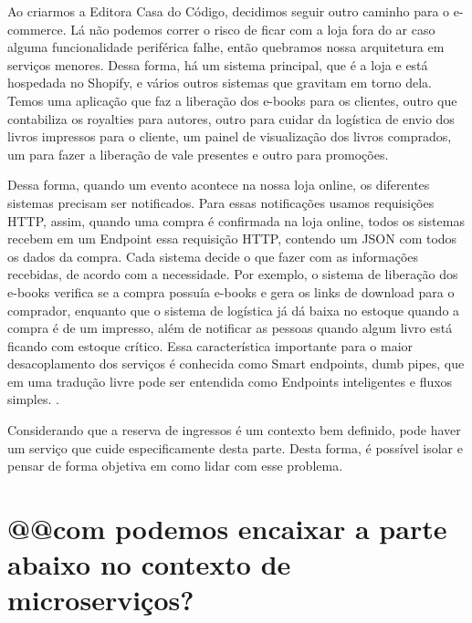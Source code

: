\begin{citacao}

Ao criarmos a Editora Casa do Código, decidimos seguir outro caminho para o e-commerce.
Lá não podemos correr o risco de ficar com a loja fora do ar caso alguma funcionalidade
periférica falhe, então quebramos nossa arquitetura em serviços menores. Dessa forma, há
um sistema principal, que é a loja e está hospedada no Shopify, e vários outros sistemas
que gravitam em torno dela. Temos uma aplicação que faz a liberação dos e-books para os
clientes, outro que contabiliza os royalties para autores, outro para cuidar da logística
de envio dos livros impressos para o cliente, um painel de visualização dos livros comprados,
um para fazer a liberação de vale presentes e outro para promoções.

Dessa forma, quando um evento acontece na nossa loja online, os diferentes sistemas precisam
ser notificados. Para essas notificações usamos requisições HTTP, assim, quando uma compra
é confirmada na loja online, todos os sistemas recebem em um Endpoint essa requisição HTTP,
contendo um JSON com todos os dados da compra. Cada sistema decide o que fazer com as informações
recebidas, de acordo com a necessidade. Por exemplo, o sistema de liberação dos e-books verifica
se a compra possuía e-books e gera os links de download para o comprador, enquanto que o sistema
de logística já dá baixa no estoque quando a compra é de um impresso, além de notificar as pessoas
quando algum livro está ficando com estoque crítico. Essa característica importante para o maior
desacoplamento dos serviços é conhecida como Smart endpoints, dumb pipes, que em uma tradução
livre pode ser entendida como Endpoints inteligentes e fluxos
simples. \cite{arquitetura-de-microservicos-ou-monolitica}.

\end{citacao}


Considerando que a reserva de ingressos é um contexto bem definido, pode haver um serviço que cuide
especificamente desta parte. Desta forma, é possível isolar e pensar de forma objetiva em como
lidar com esse problema.



\section{@@com podemos encaixar a parte abaixo no contexto de microserviços?}

